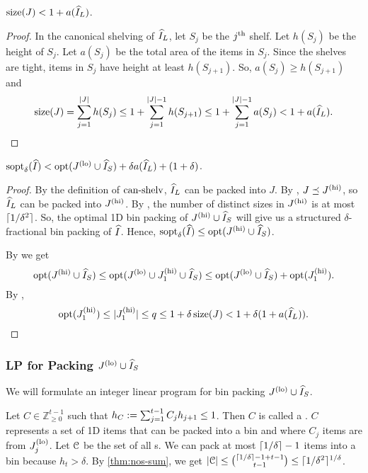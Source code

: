 \begin{lemma}
\label{thm:hgap:can-shelv-size}
$\operatorname{size}(J) < 1 + a(\widehat{I}_L)$.
\end{lemma}
\begin{proof}
In the canonical shelving of $\widehat{I}_L$, let $S_j$ be the $j^{\textrm{th}}$ shelf.
Let $h(S_j)$ be the height of $S_j$.
Let $a(S_j)$ be the total area of the items in $S_j$.
Since the shelves are tight, items in $S_j$ have height at least $h(S_{j+1})$.
So, $a(S_j) \ge h(S_{j+1})$ and
\[ \operatorname{size}(J) = \sum_{j=1}^{|J|} h(S_j) \le 1 + \sum_{j=1}^{|J|-1} h(S_{j+1})
\le 1 + \sum_{j=1}^{|J|-1} a(S_j) < 1 + a(\widehat{I}_L).
\qedhere \]
\end{proof}

\begin{lemma}
\label{thm:hgap:sopt-le-optlo}
$\operatorname{sopt}_{\delta}(\widehat{I}) < \operatorname{opt}(J^{\mathrm{(lo)}} \cup \widehat{I}_S) + \delta a(\widehat{I}_L) + (1 + \delta)$.
\end{lemma}
\begin{proof}
By the definition of $\operatorname{can-shelv}$, $\widehat{I}_L$ can be packed into $J$.
By , $J \preceq J^{\mathrm{(hi)}}$, so $\widehat{I}_L$ can be packed into $J^{\mathrm{(hi)}}$.
By , the number of distinct sizes in $J^{\mathrm{(hi)}}$
is at most $\lceil 1/\delta^2 \rceil$.
So, the optimal 1D bin packing of $J^{\mathrm{(hi)}} \cup \widehat{I}_S$ will
give us a structured $\delta$-fractional bin packing of $\widehat{I}$.
Hence, $\operatorname{sopt}_{\delta}(\widehat{I}) \le \operatorname{opt}(J^{\mathrm{(hi)}} \cup \widehat{I}_S)$.

By  we get
\[ \operatorname{opt}(J^{\mathrm{(hi)}} \cup \widehat{I}_S) \le \operatorname{opt}(J^{\mathrm{(lo)}} \cup J_1^{\mathrm{(hi)}} \cup \widehat{I}_S)
\le \operatorname{opt}(J^{\mathrm{(lo)}} \cup \widehat{I}_S) + \operatorname{opt}(J_1^{\mathrm{(hi)}}). \]
By ,
\[ \operatorname{opt}(J_1^{\mathrm{(hi)}}) \le |J_1^{\mathrm{(hi)}}| \le q \le 1 + \delta\operatorname{size}(J)
< 1 + \delta(1 + a(\widehat{I}_L)).
\qedhere \]
\end{proof}

\subsubsection{LP for Packing \texorpdfstring{$J^{\mathrm{(lo)}} \cup \widehat{I}_S$}{J\^{}lo + I\^{}\_S}}

We will formulate an integer linear program for bin packing $J^{\mathrm{(lo)}} \cup \widehat{I}_S$.

Let $C \in \mathbb{Z}_{\ge 0}^{t-1}$ such that $h_C := \sum_{j=1}^{t-1} C_jh_{j+1} \le 1$.
Then $C$ is called a \config{}.
$C$ represents a set of 1D items that can be packed into a bin
and where $C_j$ items are from $J_j^{\mathrm{(lo)}}$.
Let $\mathcal{C}$ be the set of all \config{}s.
We can pack at most $\left\lceil 1/\delta \right\rceil-1$ items into a bin because $h_t > \delta$.
By \cref{thm:nos-sum}, we get
$|\mathcal{C}| \le \binom{\left\lceil 1/\delta \right\rceil-1+t-1}{t-1} \le \lceil 1/\delta^2 \rceil^{1/\delta}$.

